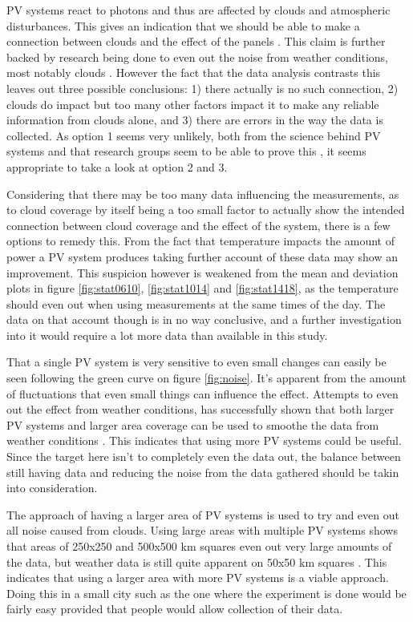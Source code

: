 PV systems react to photons and thus are affected by clouds
and atmospheric disturbances.  This gives an indication that we should be able to make
a connection between clouds and the effect of the panels
\citep{photovoltaic}.  This claim is further backed by research being
done to even out the noise from weather conditions, most notably
clouds \citep{southafrica, cloudTrack}.  However the fact that the
data analysis contrasts this leaves out three possible conclusions: 1)
there actually is no such connection, 2) clouds do impact but too many
other factors impact it to make any reliable information from clouds
alone, and 3) there are errors in the way the data is collected.  As
option 1 seems very unlikely, both from the science behind PV systems
and that research groups seem to be able to prove this
\citep{southafrica, cloudTrack, photovoltaic}, it seems appropriate to
take a look at option 2 and 3.

Considering that there may be too many data influencing the
measurements, as to cloud coverage by itself being a too small factor
to actually show the intended connection between cloud coverage and
the effect of the system, there is a few options to remedy this.  From
the fact that temperature impacts the amount of power a PV system
produces \citep{mppt2004} taking further account of these data may
show an improvement.  This suspicion however is weakened from the mean
and deviation plots in figure \ref{fig:stat0610}, \ref{fig:stat1014}
and \ref{fig:stat1418}, as the temperature should even out when using
measurements at the same times of the day.  The data on that account
though is in no way conclusive, and a further investigation into it
would require a lot more data than available in this study.

That a single PV system is very sensitive to even small changes can
easily be seen following the green curve on figure \ref{fig:noise}.
It's apparent from the amount of fluctuations that even small things
can influence the effect.  Attempts to even out the effect from
weather conditions, has successfully shown that both larger PV systems
and larger area coverage can be used to smoothe the data from weather
conditions \citep{cloudTrack,southafrica}.  This indicates that using
more PV systems could be useful.  Since the target here isn't to
completely even the data out, the balance between still having data
and reducing the noise from the data gathered should be takin into
consideration.

The approach of having a larger area of PV systems is used to try and
even out all noise caused from clouds.  Using large areas with
multiple PV systems shows that areas of 250x250 and 500x500 km squares
even out very large amounts of the data, but weather data is still
quite apparent on 50x50 km squares \citep{southafrica}.  This
indicates that using a larger area with more PV systems is a viable
approach.  Doing this in a small city such as the one where the
experiment is done would be fairly easy provided that people would
allow collection of their data.


